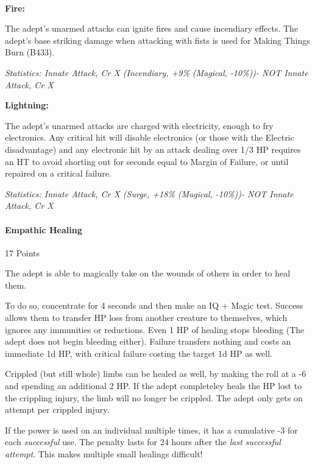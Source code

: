 \begin{multicols*}{3}
	\textbf{\\Fire:}
	
	The adept's unarmed attacks can ignite fires and cause incendiary effects. The adept's base striking damage when attacking with fists is used for Making Things Burn (B433).

	\textcolor{OliveGreen}{\textit{Statistics: Innate Attack, Cr X (Incendiary, +9\% (Magical, -10\%))- NOT Innate Attack, Cr X }}
	
	\textbf{Lightning:}
	
	The adept's unarmed attacks are charged with electricity, enough to fry electronics. Any critical hit will disable electronics (or those with the Electric disadvantage) and any electronic hit by an attack dealing over 1/3 HP requires an HT to avoid shorting out for seconds equal to Margin of Failure, or until repaired on a critical failure.
	
	\textcolor{OliveGreen}{\textit{Statistics: Innate Attack, Cr X (Surge, +18\% (Magical, -10\%))- NOT Innate Attack, Cr X }}
	
	\paragraph{Empathic Healing}
	\begin{flushright}
		17 Points
	\end{flushright}

	The adept is able to magically take on the wounds of others in order to heal them.
	
	To do so, concentrate for 4 seconds and then make an IQ + Magic test. Success allows them to transfer HP loss from another creature to themselves, which ignores any immunities or reductions. Even 1 HP of healing stops bleeding (The adept does not begin bleeding either). Failure transfers nothing and costs an immediate 1d HP, with critical failure costing the target 1d HP as well.
	
	Crippled (but still whole) limbs can be healed as well, by making the roll at a -6 and spending an additional 2 HP. If the adept completeley heals the HP lost to the crippling injury, the limb will no longer be crippled. The adept only gets on attempt per crippled injury.
	
	If the power is used on an individual multiple times, it has a cumulative -3 for each \textit{successful} use. The penalty lasts for 24 hours after the \textit{last successful attempt}. This makes multiple small healings difficult!
	

\end{multicols*}
